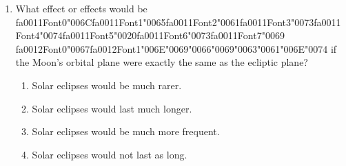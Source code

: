 \documentclass[12pt]{article}
\begin{document}
\begin{enumerate}[label=\arabic*.]
\begin{enumerate}[label=(\alph*)]
    \item They reflect enough of the sun's light to make them brighter than most background stars
    \item Asteroids have substantial motion relative to the background stars
\end{enumerate}
\item What effect or effects would be {\csname fa0011Font0\endcsname\char"006C}{\csname fa0011Font1\endcsname\char"0065}{\csname fa0011Font2\endcsname\char"0061}{\csname fa0011Font3\endcsname\char"0073}{\csname fa0011Font4\endcsname\char"0074}{\csname fa0011Font5\endcsname\char"0020}{\csname fa0011Font6\endcsname\char"0073}{\csname fa0011Font7\endcsname\char"0069} {\csname fa0012Font0\endcsname\char"0067}{\csname fa0012Font1\endcsname\char"006E}{\char"0069}{\char"0066}{\char"0069}{\char"0063}{\char"0061}{\char"006E}{\char"0074} if the Moon's orbital plane were exactly
the same as the ecliptic plane?
\begin{enumerate}[label=(\alph*)]
    \item Solar eclipses would be much rarer.
    \item Solar eclipses would last much longer.
    \item Solar eclipses would be much more frequent.
    \item Solar eclipses would not last as long.
\end{enumerate}
\end{enumerate}
\end{document}
